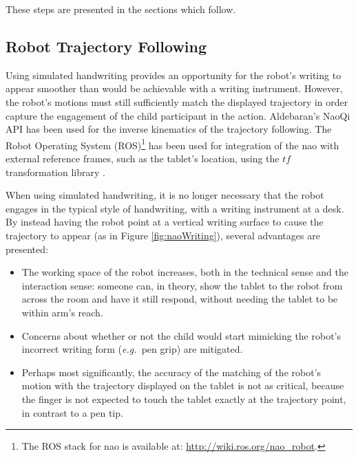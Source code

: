 \documentclass{sig-alternate}
\newcommand{\eg}{{\textit{e.g.~}}}
\begin{document}
These steps are presented in the sections which follow.

\subsection{Robot Trajectory Following}

Using simulated handwriting provides an opportunity for the robot's writing to
appear smoother than would be achievable with a writing instrument. However, the
robot's motions must still sufficiently match the displayed trajectory in order
capture the engagement of the child participant in the action. Aldebaran's NaoQi API
has been used for the inverse kinematics of the trajectory following. The Robot
Operating System (ROS)\footnote{The ROS stack for {\sc nao} is available at:
\url{http://wiki.ros.org/nao_robot}.} has been used for integration of the {\sc nao}
with external reference frames, such as the tablet's location, using the $tf$ transformation library \cite{Foote2013}.

When using simulated handwriting, it is no longer necessary that the robot
engages in the typical style of handwriting, with a writing instrument at a desk.
By instead having the robot point at a vertical writing surface to cause the
trajectory to appear (as in Figure \ref{fig:naoWriting}), several advantages are
presented:

\begin{itemize}

    \item The working space of the robot increases, both in the technical sense
        and the interaction sense: someone can, in theory, show the tablet to
        the robot from across the room and have it still respond, without
        needing the tablet to be within arm's reach.

    \item Concerns about whether or not the child would start mimicking the
        robot's incorrect writing form (\eg pen grip) are mitigated. 

    \item Perhaps most significantly, the accuracy of the matching of the
        robot's motion with the trajectory displayed on the tablet is not as
        critical, because the finger is not expected to touch the tablet exactly
        at the trajectory point, in contrast to a pen tip.

\end{itemize}
\end{document}
